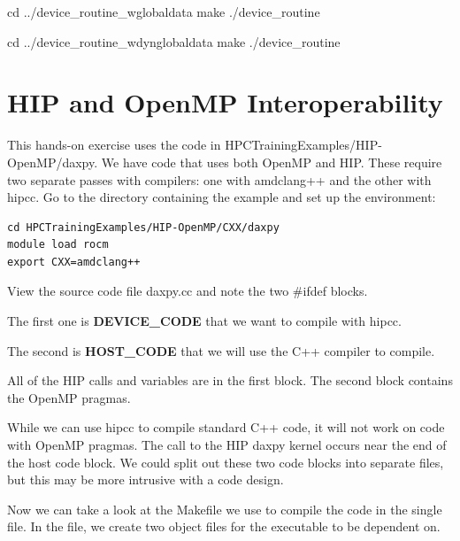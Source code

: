 \documentclass[
]{article}
\newenvironment{Shaded}{}{}
\newcommand{\BuiltInTok}[1]{#1}
\newcommand{\ExtensionTok}[1]{#1}
\newcommand{\FunctionTok}[1]{\textcolor[rgb]{0.02,0.16,0.49}{#1}}
\newcommand{\NormalTok}[1]{#1}
\begin{document}
\begin{Shaded}
\begin{Highlighting}[]
\BuiltInTok{cd}\NormalTok{ ../device\_routine\_wglobaldata}
\FunctionTok{make}
\ExtensionTok{./device\_routine}
\end{Highlighting}
\end{Shaded}

\begin{Shaded}
\begin{Highlighting}[]
\BuiltInTok{cd}\NormalTok{ ../device\_routine\_wdynglobaldata}
\FunctionTok{make}
\ExtensionTok{./device\_routine}
\end{Highlighting}
\end{Shaded}

\hypertarget{hip-and-openmp-interoperability}{%
\section{HIP and OpenMP
Interoperability}\label{hip-and-openmp-interoperability}}

This hands-on exercise uses the code in
HPCTrainingExamples/HIP-OpenMP/daxpy. We have code that uses both OpenMP
and HIP. These require two separate passes with compilers: one with
amdclang++ and the other with hipcc. Go to the directory containing the
example and set up the environment:

\begin{verbatim}
cd HPCTrainingExamples/HIP-OpenMP/CXX/daxpy
module load rocm
export CXX=amdclang++
\end{verbatim}

View the source code file daxpy.cc and note the two \#ifdef blocks.

The first one is \textbf{DEVICE\_CODE} that we want to compile with
hipcc.

The second is \textbf{HOST\_CODE} that we will use the C++ compiler to
compile.

All of the HIP calls and variables are in the first block. The second
block contains the OpenMP pragmas.

While we can use hipcc to compile standard C++ code, it will not work on
code with OpenMP pragmas. The call to the HIP daxpy kernel occurs near
the end of the host code block. We could split out these two code blocks
into separate files, but this may be more intrusive with a code design.

Now we can take a look at the Makefile we use to compile the code in the
single file. In the file, we create two object files for the executable
to be dependent on.
\end{document}
